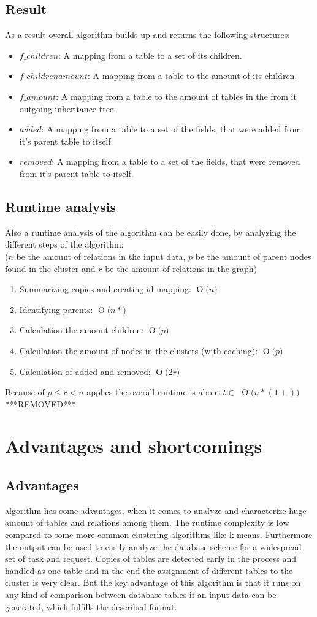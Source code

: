 \documentclass[10pt, journal, twocolumn]{IEEEtran}
\newcommand{\BigO}[1]{\ensuremath{\operatorname{O}\bigl(#1\bigr)}}
\begin{document}
\subsection{Result}
As a result overall algorithm builds up and returns the following structures:
\begin{itemize}
\item $f\_children$: A mapping from a table to a set of its children.
\item $f\_childrenamount$: A mapping from a table to the amount of its children.
\item $f\_amount$: A mapping from a table to the amount of tables in the from it outgoing inheritance tree.
\item $added$: A mapping from a table to a set of the fields, that were added from it's parent table to itself.
\item $removed$: A mapping from a table to a set of the fields, that were removed from it's parent table to itself.
\end{itemize}
\subsection{Runtime analysis}
Also a runtime analysis of the algorithm can be easily done, by analyzing the different steps of the algorithm:\\($n$ be the amount of relations in the input data, $p$ be the amount of parent nodes found in the cluster and $r$ be the amount of relations in the graph)
\begin{enumerate}
\item Summarizing copies and creating id mapping: \BigO{n}
\item Identifying parents: \BigO{n*}
\item Calculation the amount children: \BigO{p}
\item Calculation the amount of nodes in the clusters (with caching): \BigO{p}
\item Calculation of added and removed: \BigO{2r}
\end{enumerate}
Because of $p \le r < n$ applies the overall runtime is about $ t \in $ \BigO{n* (1+ )}
***REMOVED***
\section{Advantages and shortcomings}
\subsection{Advantages}
 algorithm has some advantages, when it comes to analyze and characterize huge amount of tables and relations among them. The runtime complexity is low compared to some more common clustering algorithms like k-means. Furthermore the output can be used to easily analyze the database scheme for a widespread set of task and request. Copies of tables are detected early in the process and handled as one table and in the end the assignment of different tables to the cluster is very clear. But the key advantage of this algorithm is that it runs on any kind of comparison between database tables if an input data can be generated, which fulfills the described format.
\end{document}
